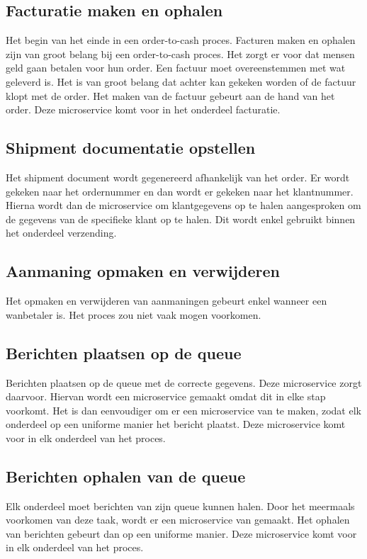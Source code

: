 \subsection{Facturatie maken en ophalen}
Het begin van het einde in een order-to-cash proces. Facturen maken en ophalen zijn van groot belang bij een order-to-cash proces. Het zorgt er voor dat mensen geld gaan betalen voor hun order. Een factuur moet overeenstemmen met wat geleverd is. Het is van groot belang dat achter kan gekeken worden of de factuur klopt met de order. Het maken van de factuur gebeurt aan de hand van het order. 
Deze microservice komt voor in het onderdeel facturatie.

\subsection{Shipment documentatie opstellen}
Het shipment document wordt gegenereerd afhankelijk van het order. Er wordt gekeken naar het ordernummer en dan wordt er gekeken naar het klantnummer. Hierna wordt dan de microservice om klantgegevens op te halen aangesproken om de gegevens van de specifieke klant op te halen. Dit wordt enkel gebruikt binnen het onderdeel verzending.

\subsection{Aanmaning opmaken en verwijderen}
Het opmaken en verwijderen van aanmaningen gebeurt enkel wanneer een wanbetaler is. Het proces zou niet vaak mogen voorkomen. 

\subsection{Berichten plaatsen op de queue}
Berichten plaatsen op de queue met de correcte gegevens. Deze microservice zorgt daarvoor. Hiervan wordt een microservice gemaakt omdat dit in elke stap voorkomt. Het is dan eenvoudiger om er een microservice van te maken, zodat elk onderdeel op een uniforme manier het bericht plaatst. 
Deze microservice komt voor in elk onderdeel van het proces.

\subsection{Berichten ophalen van de queue} 
Elk onderdeel moet berichten van zijn queue kunnen halen. Door het meermaals voorkomen van deze taak, wordt er een microservice van gemaakt. Het ophalen van berichten gebeurt dan op een uniforme manier. 
Deze microservice komt voor in elk onderdeel van het proces.

